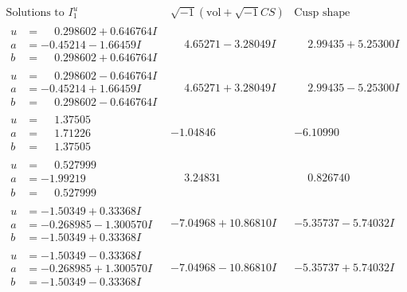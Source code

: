 \documentclass[1p]{elsarticle_modified}
\theoremstyle{definition}
\newcommand{\I}{\sqrt{-1}}
\begin{document}
$$\begin{array}{c|c|c}  
\text{Solutions to }I^u_{1}& \I (\text{vol} + \sqrt{-1}CS) & \text{Cusp shape}\\
 \hline 
\begin{aligned}
u &= \phantom{-}0.298602 + 0.646764 I \\
a &= -0.45214 - 1.66459 I \\
b &= \phantom{-}0.298602 + 0.646764 I\end{aligned}
 & \phantom{-}4.65271 - 3.28049 I & \phantom{-}2.99435 + 5.25300 I \\ \hline\begin{aligned}
u &= \phantom{-}0.298602 - 0.646764 I \\
a &= -0.45214 + 1.66459 I \\
b &= \phantom{-}0.298602 - 0.646764 I\end{aligned}
 & \phantom{-}4.65271 + 3.28049 I & \phantom{-}2.99435 - 5.25300 I \\ \hline\begin{aligned}
u &= \phantom{-}1.37505\phantom{ +0.000000I} \\
a &= \phantom{-}1.71226\phantom{ +0.000000I} \\
b &= \phantom{-}1.37505\phantom{ +0.000000I}\end{aligned}
 & -1.04846\phantom{ +0.000000I} & -6.10990\phantom{ +0.000000I} \\ \hline\begin{aligned}
u &= \phantom{-}0.527999\phantom{ +0.000000I} \\
a &= -1.99219\phantom{ +0.000000I} \\
b &= \phantom{-}0.527999\phantom{ +0.000000I}\end{aligned}
 & \phantom{-}3.24831\phantom{ +0.000000I} & \phantom{-}0.826740\phantom{ +0.000000I} \\ \hline\begin{aligned}
u &= -1.50349 + 0.33368 I \\
a &= -0.268985 - 1.300570 I \\
b &= -1.50349 + 0.33368 I\end{aligned}
 & -7.04968 + 10.86810 I & -5.35737 - 5.74032 I \\ \hline\begin{aligned}
u &= -1.50349 - 0.33368 I \\
a &= -0.268985 + 1.300570 I \\
b &= -1.50349 - 0.33368 I\end{aligned}
 & -7.04968 - 10.86810 I & -5.35737 + 5.74032 I \\ \hline\begin{aligned}

\end{aligned}
\end{array}$$
\end{document}
